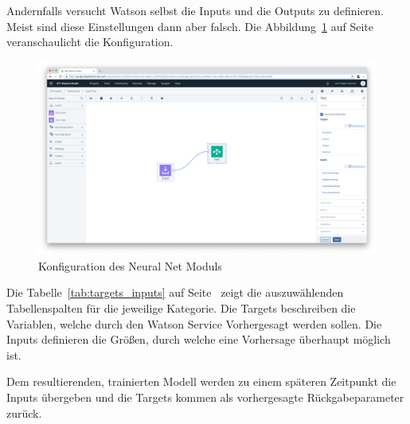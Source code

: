 Andernfalls versucht Watson selbst die Inputs und die Outputs zu definieren. Meist sind diese Einstellungen dann
aber falsch. Die Abbildung~\ref{fig:umsetzung_config_neural_net} auf Seite~\pageref{fig:umsetzung_config_neural_net}
veranschaulicht die Konfiguration.

\begin{figure}[h]
    \centering
    \includegraphics[width=\textwidth]{images/kapitel_3/umsetzung_config_neural_net.png}
    \caption{Konfiguration des Neural Net Moduls}
    \label{fig:umsetzung_config_neural_net}
\end{figure}

Die Tabelle~\ref{tab:targets_inputs} auf Seite~\pageref{tab:targets_inputs} zeigt die auszuwählenden Tabellenspalten für
die jeweilige Kategorie. Die Targets beschreiben die Variablen, welche durch den Watson Service Vorhergesagt werden
sollen. Die Inputs definieren die Größen, durch welche eine Vorhersage überhaupt möglich ist.

Dem resultierenden, trainierten Modell werden zu einem späteren Zeitpunkt die Inputs übergeben und die Targets kommen
als vorhergesagte Rückgabeparameter zurück.

